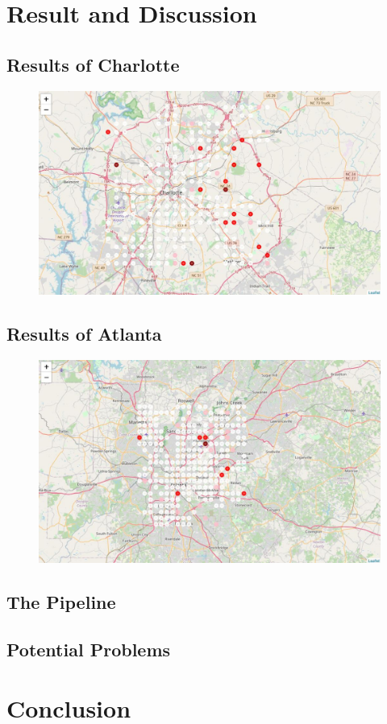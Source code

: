 \documentclass{article}
\begin{document}
\newpage

\section{Result and Discussion}

\subsection{Results of Charlotte}

\begin{figure}[h!]
\includegraphics[width=1.0\textwidth]{cn4.jpg}
\centering
\end{figure}

\newpage

\subsection{Results of Atlanta}

\begin{figure}[h!]
\includegraphics[width=1.0\textwidth]{cn5.jpg}
\centering
\end{figure}

\newpage

\subsection{The Pipeline}

\subsection{Potential Problems}

\section{Conclusion}

\newpage



\end{document}
